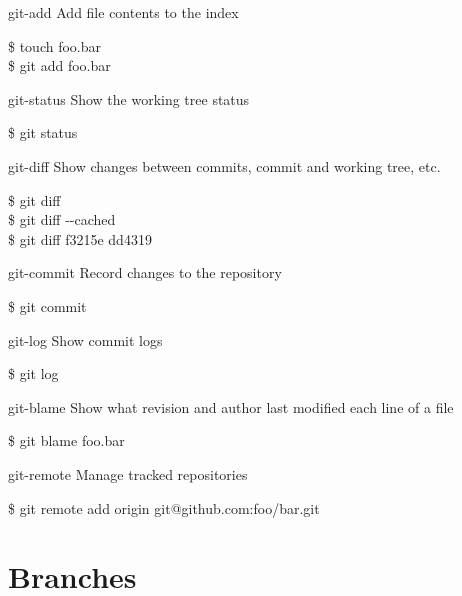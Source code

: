 \documentclass{beamer}
\begin{document}
\begin{frame}{git-add}
  Add file contents to the index
  \begin{Example}
    \$ touch foo.bar \\
    \$ git add foo.bar
  \end{Example}
\end{frame}

\begin{frame}{git-status}
  Show the working tree status
  \begin{Example}
    \$ git status
  \end{Example}
\end{frame}

\begin{frame}{git-diff}
  Show changes between commits, commit and working tree, etc.
  \begin{Example}
    \$ git diff \\
    \$ git diff -{}-cached \\
    \$ git diff f3215e dd4319
  \end{Example}
\end{frame}

\begin{frame}{git-commit}
  Record changes to the repository
  \begin{Example}
    \$ git commit
  \end{Example}
\end{frame}

\begin{frame}{git-log}
  Show commit logs
  \begin{Example}
    \$ git log
  \end{Example}
\end{frame}

\begin{frame}{git-blame}
  Show what revision and author last modified each line of a file
  \begin{Example}
    \$ git blame foo.bar
  \end{Example}
\end{frame}

\begin{frame}{git-remote}
  Manage tracked repositories
  \begin{Example}
    \$ git remote add origin git@github.com:foo/bar.git
  \end{Example}
\end{frame}

\section{Branches}
\end{document}
